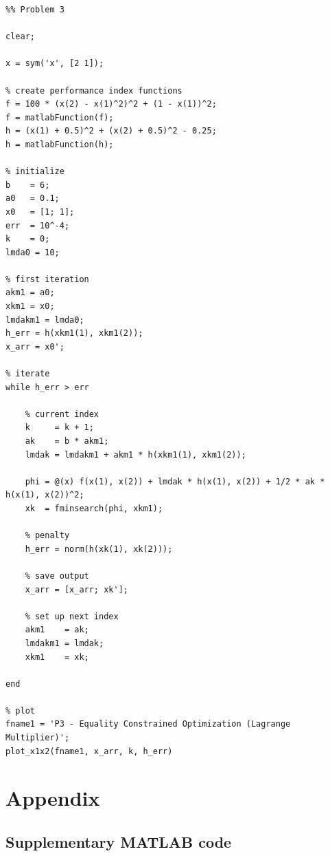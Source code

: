 \documentclass[conf]{new-aiaa}
\begin{document}
\begin{lstlisting}
%% Problem 3 

clear; 

x = sym('x', [2 1]); 

% create performance index functions 
f = 100 * (x(2) - x(1)^2)^2 + (1 - x(1))^2; 
f = matlabFunction(f); 
h = (x(1) + 0.5)^2 + (x(2) + 0.5)^2 - 0.25; 
h = matlabFunction(h); 

% initialize 
b    = 6;
a0   = 0.1; 
x0   = [1; 1]; 
err  = 10^-4; 
k    = 0; 
lmda0 = 10; 

% first iteration 
akm1 = a0; 
xkm1 = x0; 
lmdakm1 = lmda0; 
h_err = h(xkm1(1), xkm1(2));
x_arr = x0'; 

% iterate 
while h_err > err 
	
	% current index 
	k     = k + 1; 
	ak    = b * akm1; 
	lmdak = lmdakm1 + akm1 * h(xkm1(1), xkm1(2)); 

	phi = @(x) f(x(1), x(2)) + lmdak * h(x(1), x(2)) + 1/2 * ak * h(x(1), x(2))^2; 
	xk  = fminsearch(phi, xkm1); 
	
	% penalty 
	h_err = norm(h(xk(1), xk(2))); 
	
	% save output 
	x_arr = [x_arr; xk']; 
	
	% set up next index 
	akm1    = ak; 
	lmdakm1 = lmdak; 
	xkm1    = xk; 
	
end 

% plot 
fname1 = 'P3 - Equality Constrained Optimization (Lagrange Multiplier)'; 
plot_x1x2(fname1, x_arr, k, h_err)
\end{lstlisting}


\newpage
\section*{Appendix} 

\subsection*{Supplementary MATLAB code} 
\end{document}
